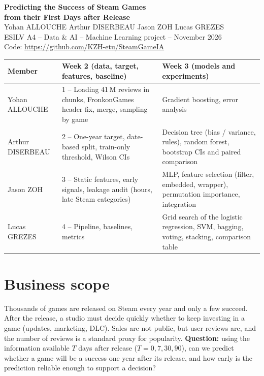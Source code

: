 \documentclass[11pt,a4paper]{article}
\begin{document}
\begin{center}
{\LARGE \textbf{Predicting the Success of Steam Games\\from their First Days after Release}}\\[8pt]
{\large Yohan ALLOUCHE \quad Arthur DISERBEAU \quad Jason ZOH \quad Lucas GREZES}\\[4pt]
ESILV A4 -- Data \& AI -- Machine Learning project -- November 2026\\[2pt]
Code: \url{https://github.com/KZH-etu/SteamGameIA}
\end{center}

\begin{center}
\small
\begin{tabular}{l p{5.0cm} p{7.0cm}}
\toprule
Member & Week 2 (data, target, features, baseline) & Week 3 (models and experiments) \\
\midrule
Yohan ALLOUCHE & 1 -- Loading 41\,M reviews in chunks, FronkonGames header fix, merge, sampling by game & Gradient boosting, error analysis \\
Arthur DISERBEAU & 2 -- One-year target, date-based split, train-only threshold, Wilson CIs & Decision tree (bias / variance, rules), random forest, bootstrap CIs and paired comparison \\
Jason ZOH & 3 -- Static features, early signals, leakage audit (hours, late Steam categories) & MLP, feature selection (filter, embedded, wrapper), permutation importance, integration \\
Lucas GREZES & 4 -- Pipeline, baselines, metrics & Grid search of the logistic regression, SVM, bagging, voting, stacking, comparison table \\
\bottomrule
\end{tabular}
\end{center}

\section{Business scope}

Thousands of games are released on Steam every year and only a few succeed. After the release, a studio
must decide quickly whether to keep investing in a game (updates, marketing, DLC). Sales are not public,
but user reviews are, and the number of reviews is a standard proxy for popularity.
\textbf{Question:} using the information available $T$ days after release ($T = 0, 7, 30, 90$), can we
predict whether a game will be a success one year after its release, and how early is the prediction
reliable enough to support a decision?
\end{document}
